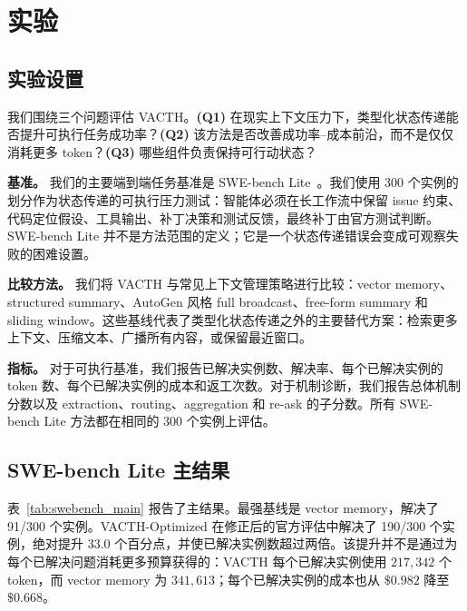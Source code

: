 \documentclass{article} %
\begin{document}
\section{实验}
\label{sec:experiments}

\subsection{实验设置}

我们围绕三个问题评估 VACTH。\textbf{(Q1)} 在现实上下文压力下，类型化状态传递能否提升可执行任务成功率？\textbf{(Q2)} 该方法是否改善成功率--成本前沿，而不是仅仅消耗更多 token？\textbf{(Q3)} 哪些组件负责保持可行动状态？

\textbf{基准。}
我们的主要端到端任务基准是 SWE-bench Lite~\cite{jimenez2024swebench}。我们使用 300 个实例的划分作为状态传递的可执行压力测试：智能体必须在长工作流中保留 issue 约束、代码定位假设、工具输出、补丁决策和测试反馈，最终补丁由官方测试判断。SWE-bench Lite 并不是方法范围的定义；它是一个状态传递错误会变成可观察失败的困难设置。

\textbf{比较方法。}
我们将 VACTH 与常见上下文管理策略进行比较：vector memory、structured summary、AutoGen 风格 full broadcast、free-form summary 和 sliding window。这些基线代表了类型化状态传递之外的主要替代方案：检索更多上下文、压缩文本、广播所有内容，或保留最近窗口。

\textbf{指标。}
对于可执行基准，我们报告已解决实例数、解决率、每个已解决实例的 token 数、每个已解决实例的成本和返工次数。对于机制诊断，我们报告总体机制分数以及 extraction、routing、aggregation 和 re-ask 的子分数。所有 SWE-bench Lite 方法都在相同的 300 个实例上评估。

\subsection{SWE-bench Lite 主结果}

表~\ref{tab:swebench_main} 报告了主结果。最强基线是 vector memory，解决了 91/300 个实例。VACTH-Optimized 在修正后的官方评估中解决了 190/300 个实例，绝对提升 $33.0$ 个百分点，并使已解决实例数超过两倍。该提升并不是通过为每个已解决问题消耗更多预算获得的：VACTH 每个已解决实例使用 $217{,}342$ 个 token，而 vector memory 为 $341{,}613$；每个已解决实例的成本也从 $\$0.982$ 降至 $\$0.668$。
\end{document}
